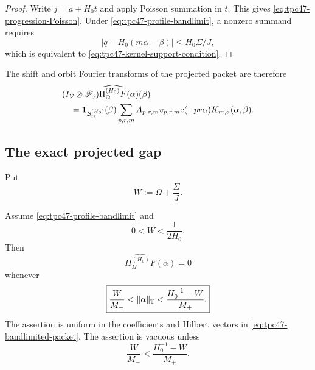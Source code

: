 \begin{proof}
Write \(j=a+H_0t\) and apply Poisson summation in \(t\).  This gives
\eqref{eq:tpc47-progression-Poisson}.  Under
\eqref{eq:tpc47-profile-bandlimit}, a nonzero summand requires
\[
 \left|q-H_0(m\alpha-\beta)\right|
 \le H_0\Sigma/J,
\]
which is equivalent to \eqref{eq:tpc47-kernel-support-condition}.
\end{proof}

The shift and orbit Fourier transforms of the projected packet are
therefore
\begin{align}
 &(I_{\mathcal V}\otimes\mathscr F_j)
 \widehat{\Pi_{\Omega}^{(H_0)}F}(\alpha)(\beta)
 \notag\\
 &\quad={}
 \mathbf 1_{\mathcal B_{\Omega}^{(H_0)}}(\beta)
 \sum_{p,r,m}A_{p,r,m}v_{p,r,m}
 \mathrm e(-pr\alpha)K_{m,a}(\alpha,\beta).
 \label{eq:tpc47-exact-modal-factorization}
\end{align}

\subsection{The exact projected gap}

Put
\begin{equation}
 W:=\Omega+\frac{\Sigma}{J}.
 \label{eq:tpc47-total-bandwidth}
\end{equation}

\begin{theorem}
\label{thm:tpc47-exact-transfer}
Assume \eqref{eq:tpc47-profile-bandlimit} and
\begin{equation}
 0<W<\frac1{2H_0}.
 \label{eq:tpc47-band-separation}
\end{equation}
Then
\begin{equation}
 \boxed{
 \widehat{\Pi_{\Omega}^{(H_0)}F}(\alpha)=0}
 \label{eq:tpc47-exact-projected-vanishing}
\end{equation}
whenever
\begin{equation}
 \boxed{
 \frac{W}{M_-}
 <\|\alpha\|_{\mathbb T}<
 \frac{H_0^{-1}-W}{M_+}.}
 \label{eq:tpc47-exact-projected-gap}
\end{equation}
 The assertion is uniform in the coefficients and Hilbert vectors in
 \eqref{eq:tpc47-bandlimited-packet}.
 The assertion is vacuous unless
 \begin{equation}
  \frac{W}{M_-}<\frac{H_0^{-1}-W}{M_+}.
  \label{eq:tpc47-nonempty-exact-gap}
 \end{equation}
\end{theorem}

